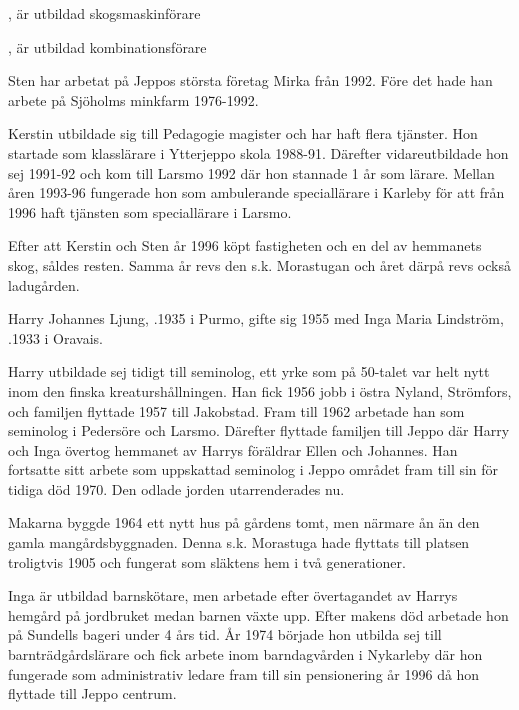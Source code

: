 \begin{jhchildren}
  \item {}, är utbildad skogsmaskinförare
  \item {}, är utbildad kombinationsförare
\end{jhchildren}


Sten har arbetat på Jeppos största företag Mirka från 1992. Före det hade han arbete på Sjöholms minkfarm 1976-1992.

Kerstin utbildade sig till Pedagogie magister och har haft flera tjänster. Hon startade som klasslärare i Ytterjeppo skola 1988-91. Därefter vidareutbildade hon sej 1991-92 och kom till Larsmo 1992 där hon stannade 1 år som lärare. Mellan åren 1993-96 fungerade hon som ambulerande speciallärare i Karleby för att från 1996 haft tjänsten som speciallärare i Larsmo.

Efter att Kerstin och Sten år 1996 köpt fastigheten och en del av hemmanets skog, såldes resten. Samma år revs den s.k. Morastugan och året därpå revs också ladugården.



Harry Johannes Ljung, .1935 i Purmo, gifte sig 1955 med Inga Maria Lindström, .1933 i Oravais.

Harry utbildade sej tidigt till seminolog, ett yrke som på 50-talet var helt nytt inom den finska kreaturshållningen. Han fick 1956 jobb i östra Nyland, Strömfors, och familjen flyttade 1957 till Jakobstad. Fram till 1962 arbetade han som seminolog i Pedersöre och Larsmo. Därefter flyttade familjen till Jeppo där Harry och Inga övertog hemmanet av Harrys föräldrar Ellen och Johannes. Han fortsatte sitt arbete som uppskattad seminolog i Jeppo området fram till sin för tidiga död 1970. Den odlade jorden utarrenderades nu.

Makarna byggde 1964 ett nytt hus på gårdens tomt, men närmare ån än den gamla mangårdsbyggnaden. Denna s.k. Morastuga hade flyttats till platsen troligtvis 1905 och fungerat som släktens hem i två generationer.

Inga är utbildad barnskötare, men arbetade efter övertagandet av Harrys hemgård på jordbruket medan barnen växte upp. Efter makens död arbetade hon på Sundells bageri under 4 års tid. År 1974 började hon utbilda sej till barnträdgårdslärare och fick arbete inom barndagvården i Nykarleby där hon fungerade som administrativ ledare fram till sin pensionering år 1996 då hon flyttade till Jeppo centrum.

